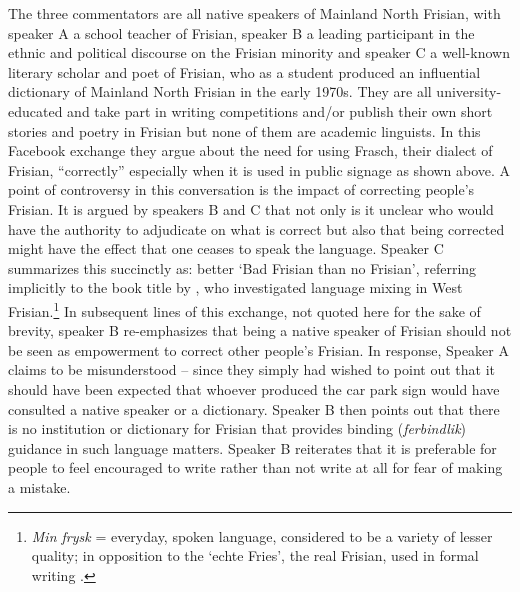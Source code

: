 \documentclass[output=paper]{langsci/langscibook}
\begin{document}
The three commentators are all native speakers of Mainland North Frisian, with speaker A a school teacher of Frisian, speaker B a leading participant in the ethnic and political discourse on the Frisian minority and speaker C a well-known literary scholar and poet of Frisian, who as a student produced an influential dictionary of Mainland North Frisian in the early 1970s. They are all university-educated and take part in writing competitions and/or publish their own short stories and poetry in Frisian but none of them are academic linguists. In this Facebook exchange they argue about the need for using Frasch, their dialect of Frisian, “correctly” especially when it is used in public signage as shown above. A point of controversy in this conversation is the impact of correcting people’s Frisian. It is argued by speakers B and C that not only is it unclear who would have the authority to adjudicate on what is correct but also that being corrected might have the effect that one ceases to speak the language. Speaker C summarizes this succinctly as: better ‘Bad Frisian than no Frisian’, referring implicitly to the book title by \citep{Sjolin1976}, who investigated language mixing in West Frisian.\footnote{\textit{Min frysk} = everyday, spoken language, considered to be a variety of lesser quality; in opposition to the ‘echte Fries’, the real Frisian, used in formal writing \citep[13]{Sjolin1976}.} In subsequent lines of this exchange, not quoted here for the sake of brevity, speaker B re-emphasizes that being a native speaker of Frisian should not be seen as empowerment to correct other people’s Frisian. In response, Speaker A claims to be misunderstood – since they simply had wished to point out that it should have been expected that whoever produced the car park sign would have consulted a native speaker or a dictionary. Speaker B then points out that there is no institution or dictionary for Frisian that provides binding (\textit{ferbindlik}) guidance in such language matters. Speaker B reiterates that it is preferable for people to feel encouraged to write rather than not write at all for fear of making a mistake.
\end{document}

